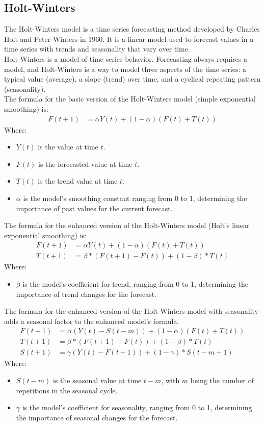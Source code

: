 \documentclass{ieeeojies}
\begin{document}
\subsection{Holt-Winters}
The Holt-Winters model is a time series forecasting method developed by Charles Holt and Peter Winters in 1960. It is a linear model used to forecast values in a time series with trends and seasonality that vary over time.\\
Holt-Winters is a model of time series behavior. Forecasting always requires a model, and Holt-Winters is a way to model three aspects of the time series: a typical value (average), a slope (trend) over time, and a cyclical repeating pattern (seasonality). \cite{b9}\\
The formula for the basic version of the Holt-Winters model (simple exponential smoothing) is:
\begin{align*}
F(t+1) &= \alpha Y(t) + (1-\alpha)(F(t) + T(t))
\end{align*}
Where:
\begin{itemize}
  \item \( Y(t) \) is the value at time \( t \).
  \item \( F(t) \) is the forecasted value at time \( t \).
  \item \( T(t) \) is the trend value at time \( t \).
  \item \( \alpha \) is the model's smoothing constant ranging from 0 to 1, determining the importance of past values for the current forecast.
\end{itemize}

The formula for the enhanced version of the Holt-Winters model (Holt's linear exponential smoothing) is:
\begin{align*}
F(t+1) &= \alpha Y(t) + (1-\alpha)(F(t) + T(t)) \\
T(t+1) &= \beta*(F(t+1)-F(t)) + (1-\beta)*T(t)
\end{align*}
Where:
\begin{itemize}
  \item \( \beta \) is the model's coefficient for trend, ranging from 0 to 1, determining the importance of trend changes for the forecast.
\end{itemize}

The formula for the enhanced version of the Holt-Winters model with seasonality adds a seasonal factor to the enhanced model's formula.
\begin{align*}
F(t+1) &= \alpha(Y(t) - S(t-m)) + (1-\alpha)(F(t) + T(t)) \\
T(t+1) &= \beta*(F(t+1)-F(t)) + (1-\beta)*T(t) \\
S(t+1) &= \gamma(Y(t) - F(t+1)) + (1-\gamma)*S(t-m+1)
\end{align*}
Where:
\begin{itemize}
  \item \( S(t-m) \) is the seasonal value at time \( t-m \), with \( m \) being the number of repetitions in the seasonal cycle.
  \item \( \gamma \) is the model's coefficient for seasonality, ranging from 0 to 1, determining the importance of seasonal changes for the forecast.
\end{itemize}
\end{document}
